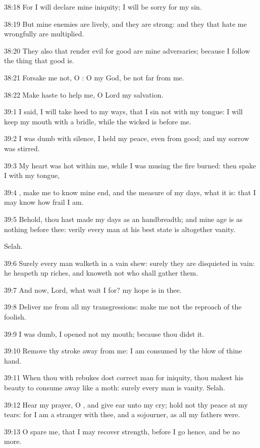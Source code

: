 38:18 For I will declare mine iniquity; I will be sorry for my sin.

38:19 But mine enemies are lively, and they are strong: and they that hate me wrongfully are multiplied.

38:20 They also that render evil for good are mine adversaries; because I follow the thing that good is.

38:21 Forsake me not, O \LORD: O my God, be not far from me.

38:22 Make haste to help me, O Lord my salvation.



39:1 I said, I will take heed to my ways, that I sin not with my tongue: I will keep my mouth with a bridle, while the wicked is before me.

39:2 I was dumb with silence, I held my peace, even from good; and my sorrow was stirred.

39:3 My heart was hot within me, while I was musing the fire burned: then spake I with my tongue,

39:4 \LORD, make me to know mine end, and the measure of my days, what it is: that I may know how frail I am.

39:5 Behold, thou hast made my days as an handbreadth; and mine age is as nothing before thee: verily every man at his best state is altogether vanity.

Selah.

39:6 Surely every man walketh in a vain shew: surely they are disquieted in vain: he heapeth up riches, and knoweth not who shall gather them.

39:7 And now, Lord, what wait I for? my hope is in thee.

39:8 Deliver me from all my transgressions: make me not the reproach of the foolish.

39:9 I was dumb, I opened not my mouth; because thou didst it.

39:10 Remove thy stroke away from me: I am consumed by the blow of thine hand.

39:11 When thou with rebukes dost correct man for iniquity, thou makest his beauty to consume away like a moth: surely every man is vanity. Selah.

39:12 Hear my prayer, O \LORD, and give ear unto my cry; hold not thy peace at my tears: for I am a stranger with thee, and a sojourner, as all my fathers were.

39:13 O spare me, that I may recover strength, before I go hence, and be no more.



